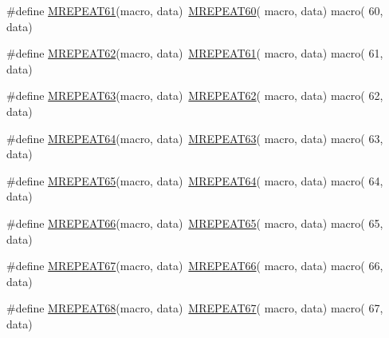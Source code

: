 \begin{DoxyCompactItemize}
\item 
\#define \mbox{\hyperlink{group__group__sam0__utils__mrepeat_ga91e94a0bcf2b901fcc9132cd2d20e5fc}{M\+R\+E\+P\+E\+A\+T61}}(macro,  data)~\mbox{\hyperlink{group__group__sam0__utils__mrepeat_ga4fd4e49134a22edba74f048333b8a4e6}{M\+R\+E\+P\+E\+A\+T60}}( macro, data)   macro( 60, data)
\item 
\#define \mbox{\hyperlink{group__group__sam0__utils__mrepeat_gac1aeda59af63e68b3212be845b9b1f5a}{M\+R\+E\+P\+E\+A\+T62}}(macro,  data)~\mbox{\hyperlink{group__group__sam0__utils__mrepeat_ga91e94a0bcf2b901fcc9132cd2d20e5fc}{M\+R\+E\+P\+E\+A\+T61}}( macro, data)   macro( 61, data)
\item 
\#define \mbox{\hyperlink{group__group__sam0__utils__mrepeat_ga73cede98c09bbcf55a373fbd3cfef422}{M\+R\+E\+P\+E\+A\+T63}}(macro,  data)~\mbox{\hyperlink{group__group__sam0__utils__mrepeat_gac1aeda59af63e68b3212be845b9b1f5a}{M\+R\+E\+P\+E\+A\+T62}}( macro, data)   macro( 62, data)
\item 
\#define \mbox{\hyperlink{group__group__sam0__utils__mrepeat_gae9165e7c138bde7089d78f4d39123c80}{M\+R\+E\+P\+E\+A\+T64}}(macro,  data)~\mbox{\hyperlink{group__group__sam0__utils__mrepeat_ga73cede98c09bbcf55a373fbd3cfef422}{M\+R\+E\+P\+E\+A\+T63}}( macro, data)   macro( 63, data)
\item 
\#define \mbox{\hyperlink{group__group__sam0__utils__mrepeat_ga823d5579d3d70018be17ac8323d074be}{M\+R\+E\+P\+E\+A\+T65}}(macro,  data)~\mbox{\hyperlink{group__group__sam0__utils__mrepeat_gae9165e7c138bde7089d78f4d39123c80}{M\+R\+E\+P\+E\+A\+T64}}( macro, data)   macro( 64, data)
\item 
\#define \mbox{\hyperlink{group__group__sam0__utils__mrepeat_ga900ae85fc32323d04086e2dd4ce7a275}{M\+R\+E\+P\+E\+A\+T66}}(macro,  data)~\mbox{\hyperlink{group__group__sam0__utils__mrepeat_ga823d5579d3d70018be17ac8323d074be}{M\+R\+E\+P\+E\+A\+T65}}( macro, data)   macro( 65, data)
\item 
\#define \mbox{\hyperlink{group__group__sam0__utils__mrepeat_ga4cb1fbebc5e11842a5e69ce245997668}{M\+R\+E\+P\+E\+A\+T67}}(macro,  data)~\mbox{\hyperlink{group__group__sam0__utils__mrepeat_ga900ae85fc32323d04086e2dd4ce7a275}{M\+R\+E\+P\+E\+A\+T66}}( macro, data)   macro( 66, data)
\item 
\#define \mbox{\hyperlink{group__group__sam0__utils__mrepeat_ga1f925f41c5c5e044e274c24fd24f3416}{M\+R\+E\+P\+E\+A\+T68}}(macro,  data)~\mbox{\hyperlink{group__group__sam0__utils__mrepeat_ga4cb1fbebc5e11842a5e69ce245997668}{M\+R\+E\+P\+E\+A\+T67}}( macro, data)   macro( 67, data)

\end{DoxyCompactItemize}
